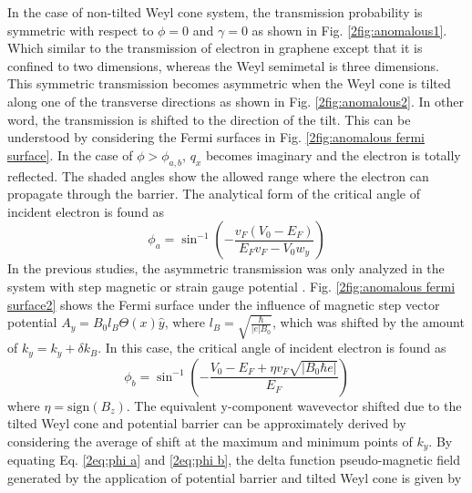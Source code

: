     In the case of non-tilted Weyl cone system, the transmission probability is symmetric with respect to $\phi = 0$ and $\gamma = 0$ as shown in Fig. \ref{2fig:anomalous1}.
    Which similar to the transmission of electron in graphene except that it is confined to two dimensions, whereas the Weyl semimetal is three dimensions.
    This symmetric transmission becomes asymmetric when the Weyl cone is tilted along one of the transverse directions as shown in Fig. \ref{2fig:anomalous2}.
    In other word, the transmission is shifted to the direction of the tilt. 
    This can be understood by considering the Fermi surfaces in Fig. \ref{2fig:anomalous fermi surface}.
    In the case of $\phi > \phi_{a,b}$, $q_x$ becomes imaginary and the electron is totally reflected.
    The shaded angles show the allowed range where the electron can propagate through the barrier.
    The analytical form of the critical angle of incident electron is found as
    \begin{equation} \label{2eq:phi a}
        \phi_a = \sin^{-1}{\left(- \frac{v_F (V_0 - E_F)}{E_F v_F - V_0 w_y}\right)}
    \end{equation}
    In the previous studies, the asymmetric transmission was only analyzed in the system with step magnetic or strain gauge potential \cite{Pereira2009,Fujita2010,Wu2010}.
    Fig. \ref{2fig:anomalous fermi surface2} shows the Fermi surface under the influence of magnetic step vector potential $A_y = B_0 l_B \Theta (x)\hat{y}$, where $l_B = \sqrt{\frac{\hbar}{|e|B_0}}$, 
    which was shifted by the amount of $k_y = k_y + \delta k_B$.
    In this case, the critical angle of incident electron is found as
    \begin{equation} \label{2eq:phi b}
        \phi_b = \sin^{-1}{\left(-\frac{V_0 - E_F + \eta v_F \sqrt{|B_0 \hbar e|}}{E_F}\right)}
    \end{equation}
    where $\eta = \mathrm{sign}(B_z)$. The equivalent y-component wavevector shifted due to the tilted Weyl cone and potential barrier can be approximately derived by considering the average of shift
    at the maximum and minimum points of $k_y$.
    By equating Eq. \ref{2eq:phi a} and \ref{2eq:phi b}, the delta function pseudo-magnetic field generated by the application of potential barrier and tilted Weyl cone is given by


